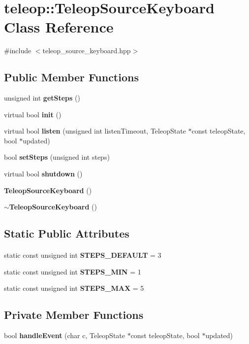 \section{teleop::TeleopSourceKeyboard Class Reference}
\label{classteleop_1_1TeleopSourceKeyboard}


{\ttfamily \#include $<$teleop\_\-source\_\-keyboard.hpp$>$}

\subsection*{Public Member Functions}
\begin{DoxyCompactItemize}
\item 
unsigned int {\bf getSteps} ()
\item 
virtual bool {\bf init} ()
\item 
virtual bool {\bf listen} (unsigned int listenTimeout, TeleopState $\ast$const teleopState, bool $\ast$updated)
\item 
bool {\bf setSteps} (unsigned int steps)
\item 
virtual bool {\bf shutdown} ()
\item 
{\bf TeleopSourceKeyboard} ()
\item 
{\bf $\sim$TeleopSourceKeyboard} ()
\end{DoxyCompactItemize}
\subsection*{Static Public Attributes}
\paragraph*{}
\begin{DoxyCompactItemize}
\item 
static const unsigned int {\bf STEPS\_\-DEFAULT} = 3
\item 
static const unsigned int {\bf STEPS\_\-MIN} = 1
\item 
static const unsigned int {\bf STEPS\_\-MAX} = 5
\end{DoxyCompactItemize}

\subsection*{Private Member Functions}
\begin{DoxyCompactItemize}
\item 
bool {\bf handleEvent} (char c, TeleopState $\ast$const teleopState, bool $\ast$updated)
\end{DoxyCompactItemize}
